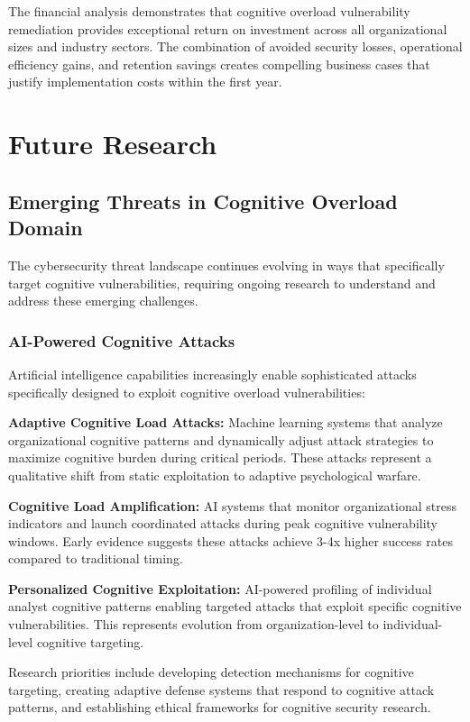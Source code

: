 \documentclass[11pt,a4paper]{article}
\begin{document}
The financial analysis demonstrates that cognitive overload vulnerability remediation provides exceptional return on investment across all organizational sizes and industry sectors. The combination of avoided security losses, operational efficiency gains, and retention savings creates compelling business cases that justify implementation costs within the first year.

\section{Future Research}

\subsection{Emerging Threats in Cognitive Overload Domain}

The cybersecurity threat landscape continues evolving in ways that specifically target cognitive vulnerabilities, requiring ongoing research to understand and address these emerging challenges.

\subsubsection{AI-Powered Cognitive Attacks}

Artificial intelligence capabilities increasingly enable sophisticated attacks specifically designed to exploit cognitive overload vulnerabilities:

\textbf{Adaptive Cognitive Load Attacks:} Machine learning systems that analyze organizational cognitive patterns and dynamically adjust attack strategies to maximize cognitive burden during critical periods. These attacks represent a qualitative shift from static exploitation to adaptive psychological warfare.

\textbf{Cognitive Load Amplification:} AI systems that monitor organizational stress indicators and launch coordinated attacks during peak cognitive vulnerability windows. Early evidence suggests these attacks achieve 3-4x higher success rates compared to traditional timing.

\textbf{Personalized Cognitive Exploitation:} AI-powered profiling of individual analyst cognitive patterns enabling targeted attacks that exploit specific cognitive vulnerabilities. This represents evolution from organization-level to individual-level cognitive targeting.

Research priorities include developing detection mechanisms for cognitive targeting, creating adaptive defense systems that respond to cognitive attack patterns, and establishing ethical frameworks for cognitive security research.
\end{document}
